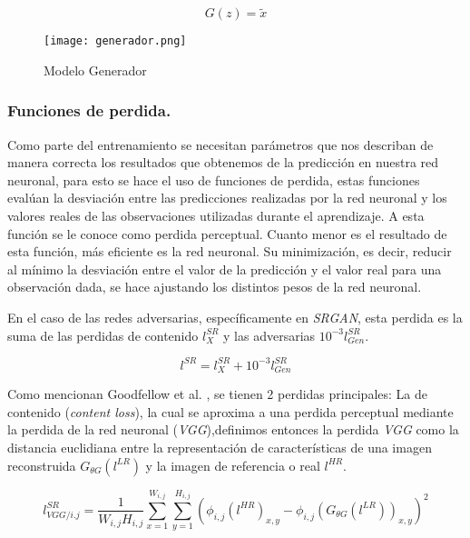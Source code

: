 \begin{equation}
G(z) = \tilde{x}
\end{equation}

\begin{figure}[H]
    \begin{center}
      \texttt{[image: generador.png]}
      \caption{Modelo Generador}
      \label{Alexis3}
    \end{center}
\end{figure}
    
\subsubsection{Funciones de perdida.}

Como parte del entrenamiento se necesitan parámetros que nos describan de manera correcta los resultados
que obtenemos de la predicción en nuestra red neuronal, para esto se hace el uso de funciones de perdida, estas funciones 
evalúan la desviación entre las predicciones realizadas por la red neuronal y los valores 
reales de las observaciones utilizadas durante el aprendizaje. A esta función se le conoce como perdida perceptual. Cuanto menor es el resultado de esta función, 
más eficiente es la red neuronal. Su minimización, es decir, reducir al mínimo la desviación entre el valor de la predicción y
el valor real para una observación dada, se hace ajustando los distintos pesos de la red neuronal.

En el caso de las redes adversarias, específicamente en \emph{SRGAN}, esta perdida es la suma de las perdidas de contenido $l_{X}^{SR}$ 
y las adversarias $10^{-3}l_{Gen}^{SR}$.


\begin{equation}
  l^{SR}=l_{X}^{SR} + 10^{-3}l_{Gen}^{SR}
\end{equation}


Como mencionan Goodfellow et al. \cite{GANs}, se tienen 
2 perdidas principales: La de contenido (\emph{content loss}), la cual se aproxima a una perdida perceptual mediante la perdida
de la red neuronal (\emph{VGG}),definimos entonces la perdida \emph{VGG} como la distancia euclidiana entre la representación de
características de una imagen reconstruida $G_{\theta G}(l^{LR})$ y la imagen de referencia o real $l^{HR}$.


\begin{equation}
  l_{VGG/i.j}^{SR}=\frac{1}{W_{i,j}H_{i,j}} \sum_{x=1}^{W_{i,j}}\sum_{y=1}^{H_{i,j}}(\phi_{i,j}(l^{HR})_{x,y}-\phi_{i,j} 
  (G_{\theta G}(l^{LR}))_{x,y})^{2}
\end{equation}

